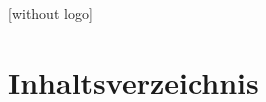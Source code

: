 \documentclass{beamer}
\title{\myTitle}
\author{\myAuthor}
\date{\today}
\institute{\myFaculty \\ [0.5cm] \myUniversity}
\begin{document}


[without logo]

\section*{Inhaltsverzeichnis}
\begin{frame}
    \tableofcontents
\end{frame}






\end{document}
